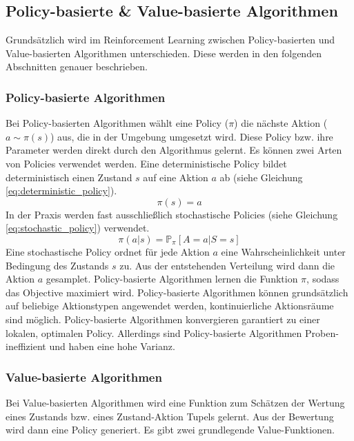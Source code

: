 \subsection{Policy-basierte \& Value-basierte Algorithmen}
Grundsätzlich wird im Reinforcement Learning zwischen Policy-basierten und Value-basierten Algorithmen unterschieden. Diese werden in den folgenden Abschnitten genauer beschrieben.

\subsubsection{Policy-basierte Algorithmen}
Bei Policy-basierten Algorithmen wählt eine Policy ($\pi$) die nächste Aktion ($a \sim \pi(s)$) aus, die in der Umgebung umgesetzt wird. Diese Policy bzw. ihre Parameter werden direkt durch den Algorithmus gelernt. Es können zwei Arten von Policies verwendet werden. Eine deterministische Policy bildet deterministisch einen Zustand $s$ auf eine Aktion $a$ ab (siehe Gleichung \ref{eq:deterministic_policy}). \cite{FoundationsDeepRL}
\begin{equation}
    \pi(s) = a
    \label{eq:deterministic_policy}
\end{equation}
In der Praxis werden fast ausschließlich stochastische Policies (siehe Gleichung \ref{eq:stochastic_policy}) verwendet.
\begin{equation}
    \pi(a\vert s) = \mathbb{P}_{\pi}\left[ A=a \vert S=s \right]
    \label{eq:stochastic_policy}
\end{equation}
Eine stochastische Policy ordnet für jede Aktion $a$ eine Wahrscheinlichkeit unter Bedingung des Zustands $s$ zu. Aus der entstehenden Verteilung wird dann die Aktion $a$ gesamplet. Policy-basierte Algorithmen lernen die Funktion $\pi$, sodass das Objective maximiert wird.
Policy-basierte Algorithmen können grundsätzlich auf beliebige Aktionstypen angewendet werden, kontinuierliche Aktionsräume sind möglich. Policy-basierte Algorithmen konvergieren garantiert zu einer lokalen, optimalen Policy. Allerdings sind Policy-basierte Algorithmen Proben-ineffizient und haben eine hohe Varianz. \cite{deepRL-2020}

\subsubsection{Value-basierte Algorithmen}
Bei Value-basierten Algorithmen wird eine Funktion zum Schätzen der Wertung eines Zustands bzw. eines Zustand-Aktion Tupels gelernt. Aus der Bewertung wird dann eine Policy generiert. Es gibt zwei grundlegende Value-Funktionen.

